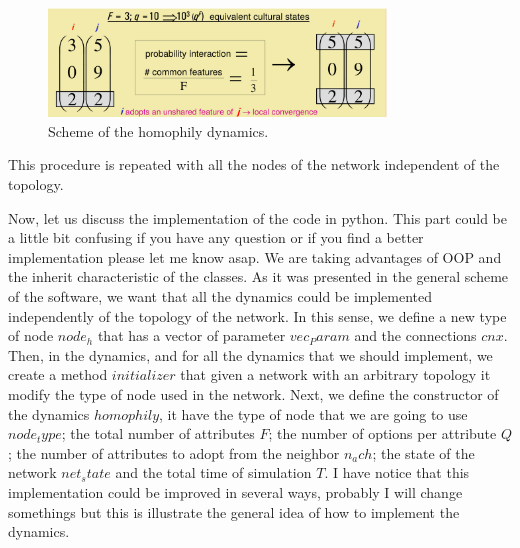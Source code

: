 \documentclass{article}
\begin{document}
\begin{figure}
    \centering
    \includegraphics[width=0.8\textwidth]{hom.eps}
    \caption{Scheme of the homophily dynamics.}
    \label{hom}
\end{figure}

This procedure is repeated with all the nodes of the network independent of the topology.

Now, let us discuss the implementation of the code in python. This part could be a little bit confusing if you have any question or if you find a better implementation please let me know asap. We are taking advantages of OOP and the inherit characteristic of the classes. As it was presented in the general scheme of the software, we want that all the dynamics could be implemented independently of the topology of the network. In this sense, we define a new type of node $node_h$ that has a vector of parameter $vec_Param$ and the connections $cnx$. Then, in the dynamics, and for all the dynamics that we should implement, we create a method $initializer$ that given a network with an arbitrary topology it modify the type of node used in the network. Next, we define the constructor of the dynamics $homophily$, it have the type of node that we are going to use $node_type$; the total number of attributes $F$; the number of options per attribute $Q$; the number of attributes to adopt from the neighbor $n_ach$; the state of the network $net_state$ and the total time of simulation $T$. I have notice that this implementation could be improved in several ways, probably I will change somethings but this is illustrate the general idea of how to implement the dynamics. 
\end{document}
